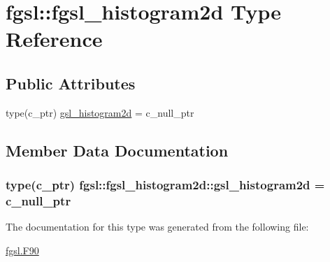 \hypertarget{structfgsl_1_1fgsl__histogram2d}{\section{fgsl\-:\-:fgsl\-\_\-histogram2d Type Reference}
\label{structfgsl_1_1fgsl__histogram2d}
}
\subsection*{Public Attributes}
\begin{DoxyCompactItemize}
\item 
type(c\-\_\-ptr) \hyperlink{structfgsl_1_1fgsl__histogram2d_a9cb2cbcab12a56f1b458247180418670}{gsl\-\_\-histogram2d} = c\-\_\-null\-\_\-ptr
\end{DoxyCompactItemize}


\subsection{Member Data Documentation}
\hypertarget{structfgsl_1_1fgsl__histogram2d_a9cb2cbcab12a56f1b458247180418670}{
\subsubsection[{gsl\-\_\-histogram2d}]{\setlength{\rightskip}{0pt plus 5cm}type(c\-\_\-ptr) fgsl\-::fgsl\-\_\-histogram2d\-::gsl\-\_\-histogram2d = c\-\_\-null\-\_\-ptr}}\label{structfgsl_1_1fgsl__histogram2d_a9cb2cbcab12a56f1b458247180418670}


The documentation for this type was generated from the following file\-:\begin{DoxyCompactItemize}
\item 
\hyperlink{fgsl_8F90}{fgsl.\-F90}\end{DoxyCompactItemize}
